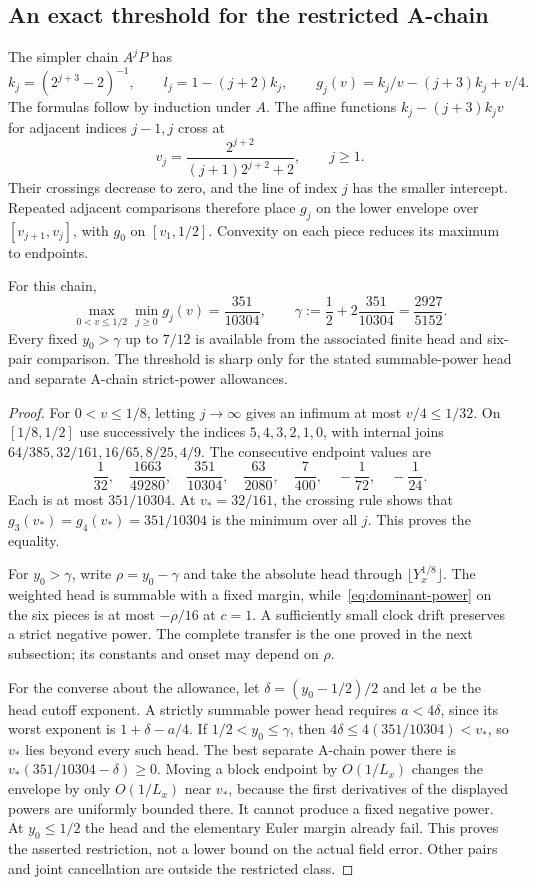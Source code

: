 \subsection{An exact threshold for the restricted A-chain}

The simpler chain $A^jP$ has
\[
 k_j=(2^{j+3}-2)^{-1},\qquad l_j=1-(j+2)k_j,
 \qquad g_j(v)=k_j/v-(j+3)k_j+v/4.
\]
The formulas follow by induction under $A$.
The affine functions $k_j-(j+3)k_jv$ for adjacent indices $j-1,j$
cross at
\[
 v_j=\frac{2^{j+2}}{(j+1)2^{j+2}+2},\qquad j\ge1.
\]
Their crossings decrease to zero, and the line of index $j$ has the
smaller intercept. Repeated adjacent comparisons therefore place
$g_j$ on the lower envelope over $[v_{j+1},v_j]$, with $g_0$ on
$[v_1,1/2]$. Convexity on each piece reduces its maximum to endpoints.

\begin{proposition}\label{prop:A-threshold}
For this chain,
\[
 \max_{0<v\le1/2}\min_{j\ge0}g_j(v)=\frac{351}{10304},
 \qquad \gamma:=\frac12+2\frac{351}{10304}=\frac{2927}{5152}.
\]
Every fixed $y_0>\gamma$ up to $7/12$ is available from the associated
finite head and six-pair comparison. The threshold is sharp only for
the stated summable-power head and separate A-chain strict-power
allowances.
\end{proposition}

\begin{proof}
For $0<v\le1/8$, letting $j\to\infty$ gives an infimum at most
$v/4\le1/32$. On $[1/8,1/2]$ use successively the indices
$5,4,3,2,1,0$, with internal joins
$64/385,32/161,16/65,8/25,4/9$.
The consecutive endpoint values are
\[
 \frac1{32},\quad\frac{1663}{49280},\quad\frac{351}{10304},\quad
 \frac{63}{2080},\quad\frac7{400},\quad-\frac1{72},\quad-\frac1{24}.
\]
Each is at most $351/10304$. At $v_*=32/161$, the crossing rule
shows that $g_3(v_*)=g_4(v_*)=351/10304$ is the minimum over all $j$.
This proves the equality.

For $y_0>\gamma$, write $\rho=y_0-\gamma$ and take the absolute head
through $\lfloor Y_x^{1/8}\rfloor$. The weighted head is summable
with a fixed margin, while~\eqref{eq:dominant-power} on the six
pieces is at most $-\rho/16$ at $c=1$. A sufficiently small clock
drift preserves a strict negative power. The complete transfer is the
one proved in the next subsection; its constants and onset may depend
on $\rho$.

For the converse about the allowance, let
$\delta=(y_0-1/2)/2$ and let $a$ be the head cutoff exponent.
A strictly summable power head requires $a<4\delta$, since its
worst exponent is $1+\delta-a/4$. If $1/2<y_0\le\gamma$, then
$4\delta\le4(351/10304)<v_*$, so $v_*$ lies beyond every such head.
The best separate A-chain power there is
$v_*(351/10304-\delta)\ge0$. Moving a block endpoint by
$O(1/L_x)$ changes the envelope by only $O(1/L_x)$ near $v_*$,
because the first derivatives of the displayed powers are uniformly
bounded there. It cannot produce a fixed negative power. At
$y_0\le1/2$ the head and the elementary Euler margin already fail.
This proves the asserted restriction, not a lower bound on the
actual field error. Other pairs and joint cancellation are outside
the restricted class.
\end{proof}

